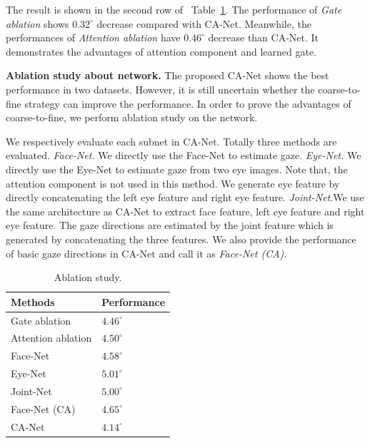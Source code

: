 \documentclass[letterpaper]{article}
\def\bm #1{\boldsymbol{#1}}%
\newcommand{\Tref}[1]{Table~\ref{#1}}
\begin{document}
The result is shown in the second row of ~\Tref{table:ablation}.
The performance of \emph{Gate ablation} shows $0.32^{\circ}$ decrease compared with CA-Net.
Meanwhile, the performances of \emph{Attention ablation} have $0.46^{\circ}$ decrease than CA-Net.
It demonstrates the advantages of attention component and learned gate.

\textbf{Ablation study about network.}
The proposed CA-Net shows the best performance in two datasets.
However, it is still uncertain whether the coarse-to-fine strategy can improve the performance.
In order to prove the advantages of coarse-to-fine, we perform ablation study on the network.

We respectively evaluate each subnet in CA-Net. Totally three methods are evaluated.
\emph{Face-Net.} We directly use the Face-Net to estimate gaze.
\emph{Eye-Net.} We directly use the Eye-Net to estimate gaze from two eye images. Note that, the attention component is not used in this method. We generate eye feature by directly concatenating the left eye feature and right eye feature.
\emph{Joint-Net}.We use the same architecture as CA-Net to extract face feature, left eye feature and right eye feature. The gaze directions are estimated by the joint feature which is generated by concatenating the three features.
We also provide the performance of basic gaze directions in CA-Net and call it as \emph{Face-Net (CA)}.


\begin{table}[t]
	\renewcommand\arraystretch{1.3}
	\normalsize
	\caption{Ablation study.}
	\begin{center}
		\begin{adjustbox}{width=0.77\columnwidth}
\begin{tabular}{|p{4.0cm}<{\centering}|p{3.0cm}<{\centering}|}
			\hline
			Methods & Performance\\
			\hline
			Gate ablation 					&$4.46^{\circ}$				\\
			Attention ablation 			&$4.50^{\circ}$				\\

			\hline
			Face-Net				&$4.58^{\circ}$					\\
			Eye-Net				&$5.01^{\circ}$					\\
			Joint-Net		&$5.00^{\circ}$					\\
			Face-Net (CA)	&$4.65^{\circ}$	\\
			\hline
			CA-Net					&$\bm{4.14^{\circ}}$		\\
			\hline
		\end{tabular}
\end{adjustbox}
	\end{center}
	\label{table:ablation}
\end{table}
\end{document}
